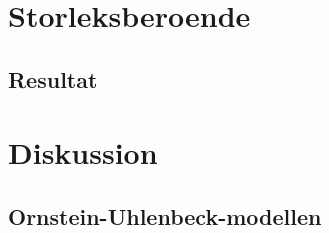 
\begin{figure}\centering
 
\caption{}
\label{fig:fordelning_kvot}
\end{figure}

\begin{figure}\centering

\caption{}
\label{fig:asymmetri}
\end{figure}


\section{Storleksberoende}


\subsection{Resultat}


\section{Diskussion}

\subsection{Ornstein-Uhlenbeck-modellen}





